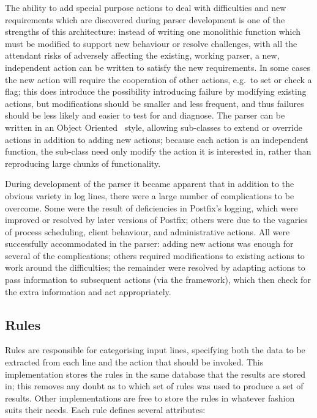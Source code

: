 \documentclass[draft]{svmult}
\begin{document}
The ability to add special purpose actions to deal with difficulties and
new requirements which are discovered during parser development is one of
the strengths of this architecture: instead of writing one monolithic
function which must be modified to support new behaviour or resolve
challenges, with all the attendant risks of adversely affecting the
existing, working parser, a new, independent action can be written to
satisfy the new requirements.  In some cases the new action will require
the cooperation of other actions, e.g.\ to set or check a flag; this does
introduce the possibility introducing failure by modifying existing
actions, but modifications should be smaller and less frequent, and thus
failures should be less likely and easier to test for and diagnose.  The
parser can be written in an Object
Oriented~\cite{Wikipedia-object-orientation} style, allowing sub-classes to
extend or override actions in addition to adding new actions; because each
action is an independent function, the sub-class need only modify the
action it is interested in, rather than reproducing large chunks of
functionality.

\label{complications}

During development of the parser it became apparent that in addition to the
obvious variety in log lines, there were a large number of complications to
be overcome.  Some were the result of
deficiencies in Postfix's logging, which were improved or resolved by later
versions of Postfix; others were due to the vagaries of process scheduling,
client behaviour, and administrative actions.  All were successfully
accommodated in the parser: adding new actions was enough for several of
the complications; others required modifications to existing actions to
work around the difficulties; the remainder were resolved by adapting
actions to pass information to subsequent actions (via the framework),
which then check for the extra information and act appropriately.


\subsection{Rules}

\label{Rules}

Rules are responsible for categorising input lines, specifying both the
data to be extracted from each line and the action that should be invoked.
This implementation stores the rules in the same \SQL{} database that the
results are stored in; this removes any doubt as to which set of rules was
used to produce a set of results.  Other implementations are free to store
the rules in whatever fashion suits their needs.  Each rule defines several
attributes:
\end{document}
